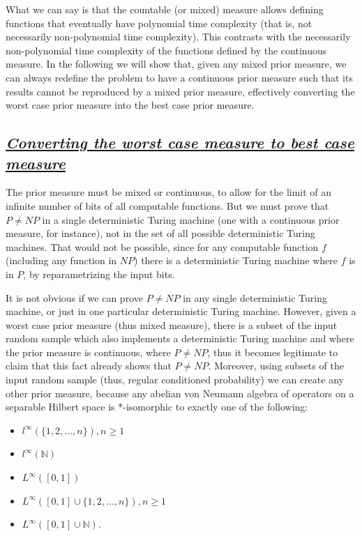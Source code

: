 \documentclass[11pt]{book}
\begin{document}
What we can say is that the countable (or mixed) measure allows defining
functions that eventually have polynomial time complexity (that is, not
necessarily non-polynomial time complexity). This contrasts with the
necessarily non-polynomial time complexity of the functions defined by
the continuous measure. In the following we will show that, given any
mixed prior measure, we can always redefine the problem to have a
continuous prior measure such that its results cannot be reproduced by a
mixed prior measure, effectively converting the worst case prior measure
into the best case prior measure.

\hypertarget{converting-the-worst-case-measure-to-best-case-measure}{%
\subsection{\texorpdfstring{\href{}{\emph{Converting the worst case
measure to best case
measure}}}{Converting the worst case measure to best case measure}}\label{converting-the-worst-case-measure-to-best-case-measure}}

The prior measure must be mixed or continuous, to allow for the limit of
an infinite number of bits of all computable functions. But we must
prove that \(P\neq NP\) in a single deterministic Turing machine (one
with a continuous prior measure, for instance), not in the set of all
possible deterministic Turing machines. That would not be possible,
since for any computable function \(f\) (including any function in
\(NP\)) there is a deterministic Turing machine where \(f\) is in \(P\),
by reparametrizing the input bits.

It is not obvious if we can prove \(P\neq NP\) in any single
deterministic Turing machine, or just in one particular deterministic
Turing machine. However, given a worst case prior measure (thus mixed
measure), there is a subset of the input random sample which also
implements a deterministic Turing machine and where the prior measure is
continuous, where \(P\neq NP\), thus it becomes legitimate to claim that
this fact already shows that \(P\neq NP\). Moreover, using subsets of
the input random sample (thus, regular conditioned probability) we can
create any other prior measure, because any abelian von Neumann algebra
of operators on a separable Hilbert space is *-isomorphic to exactly one
of the following:

\begin{itemize}
\item
  \(l^\infty(\{ 1 , 2 , ... , n \} ) , n \geq 1\)
\item
  \(l^\infty(\mathbb{N})\)
\item
  \(L^\infty([0,1])\)
\item
  \(L^\infty([0,1]\cup\{ 1 , 2 , ... , n \} ) , n \geq 1\)
\item
  \(L^\infty([0,1]\cup \mathbb{N})\).
\end{itemize}
\end{document}
